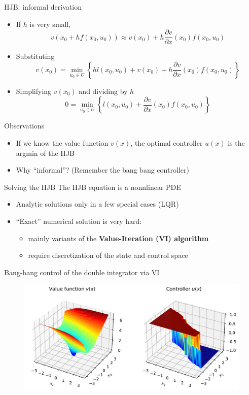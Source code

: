 \documentclass[aspectratio=169]{beamer}
\begin{document}
\begin{frame}{HJB: informal derivation}
\begin{itemize}
\item
If $h$ is very small,
$$
v(x_0 + h f(x_0, u_0)) \approx v(x_0) + h \frac{\partial v}{\partial x} (x_0) f(x_0, u_0)
$$
\pause
\vspace{-5mm}
\item
Substituting
$$
v(x_0) = \min_{u_0 \in U} \left\{ h l(x_0, u_0) +  v(x_0) + h \frac{\partial v}{\partial x} (x_0) f(x_0, u_0) \right\}
$$
\pause
\item
Simplifying $v(x_0)$ and dividing by $h$
$$
0 = \min_{u_0 \in U} \left\{ l(x_0, u_0) + \frac{\partial v}{\partial x} (x_0) f(x_0, u_0) \right\}
$$
\end{itemize}
\pause
\begin{block}{Observations}
\begin{itemize}
\item
If we know the value function $v(x)$, the optimal controller $u(x)$ is the argmin of the HJB
\pause
\item
Why ``informal''? (Remember the bang bang controller)
\end{itemize}
\end{block}
\end{frame}

\begin{frame}{Solving the HJB
\href{https://mybinder.org/v2/gh/RussTedrake/underactuated/master?filepath=examples\%2Fdouble\_integrator\%2Fvalue\_iteration.ipynb}{}}
The HJB equation is a nonnlinear PDE
\begin{itemize}
\item
Analytic solutions only in a few special cases (LQR)
\item
``Exact'' numerical solution is very hard:
\begin{itemize}
\item
mainly variants of the \textbf{Value-Iteration (VI) algorithm}
\item
require discretization of the state and control space
\end{itemize}
\end{itemize}
\pause
\begin{block}{Bang-bang control of the double integrator via VI}
\begin{figure}
\includegraphics[width=.5\columnwidth]{figures/value_iteration.pdf}
\end{figure}
\end{block}
\end{frame}
\end{document}
